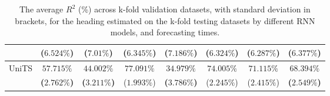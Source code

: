 \begin{table}[!ht]
{\begin{tabular}{|c|c|c|c|c|c|c|c|}
			 & ($6.524\%$) & ($7.01\%$) & ($6.345\%$) & ($7.186\%$) & ($6.324\%$) & ($6.287\%$) & ($6.377\%$) \\ \hline
			\multirow{2}{*}{UniTS} & $\mathbf{57.715\%}$ & $\mathbf{44.002\%}$ & $77.091\%$ & $\mathbf{34.979\%}$ & $74.005\%$ & $71.115\%$ & $\mathbf{68.394\%}$ \\
			 & \textbf{(}$\mathbf{2.762\%}$\textbf{)} & \textbf{(}$\mathbf{3.211\%}$\textbf{)} & ($1.993\%$) & \textbf{(}$\mathbf{3.786\%}$\textbf{)} & ($2.245\%$) & ($2.415\%$) & \textbf{(}$\mathbf{2.549\%}$\textbf{)} \\ \hline
		\end{tabular}
	}
	\caption{The average $R^{2}$ (\%) across k-fold validation datasets, with standard deviation in brackets, for the heading estimated on the k-fold testing datasets by different RNN models, and forecasting times.}
	\label{tab:all_direction_R2}
\end{table}